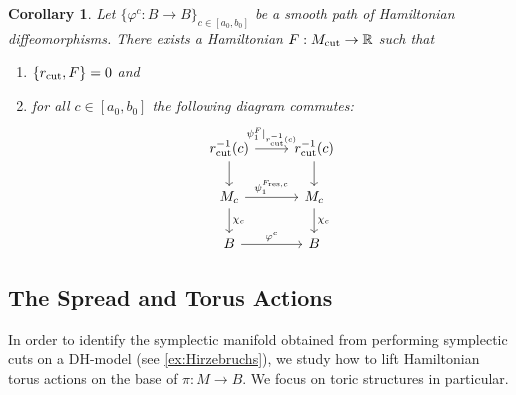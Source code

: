 \documentclass[10pt,oneside,reqno]{amsart}
\newtheorem{corollary}[theorem]{Corollary}
\theoremstyle{definition}
\newcommand{\IR}{\mathbb{R}}
\newcommand{\resc}{{\textup{res},c}}
\newcommand{\cut}{\textup{cut}}
\begin{document}
\begin{corollary}
    \label{cor:spread_cut}
    Let $\{\varphi^c:B\to B\}_{c\in[a_0,b_0]}$ be a smooth path of Hamiltonian diffeomorphisms. There exists a Hamiltonian $F:M_\cut \to \IR$ such that
    \begin{enumerate}
        \item $\{r_\cut,F\}=0$ and
        \item for all $c \in [a_0,b_0]$ the following diagram commutes:
        \begin{equation*}
            \begin{tikzcd}
r_\cut^{-1}(c) \arrow[r, "\psi^F_1 \vert_{r_\cut^{-1}(c)}"] \arrow[d] & r_\cut^{-1}(c) \arrow[d] \\
M_c \arrow[r, "\psi^{F_\resc}_1"] \arrow[d, "\chi_c"]              & M_c \arrow[d, "\chi_c"]                      \\
B \arrow[r, "\varphi^c"]                                           & B                                           
\end{tikzcd}
        \end{equation*}
    \end{enumerate}
\end{corollary}

\subsection{The Spread and Torus Actions}

In order to identify the symplectic manifold obtained from performing symplectic cuts on a DH-model (see \cref{ex:Hirzebruchs}), we study how to lift Hamiltonian torus actions on the base of $\pi \colon M \rightarrow B$. We focus on toric structures in particular.
\end{document}
